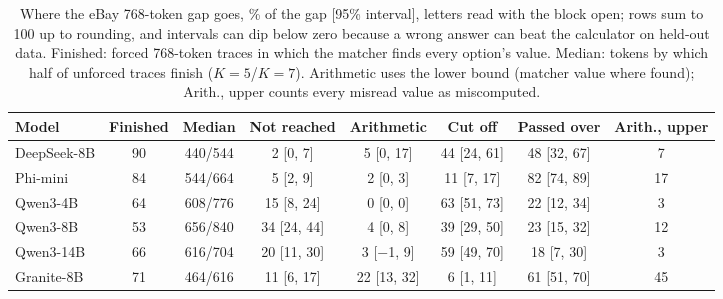 \begin{table}[t]
\caption{Where the eBay 768-token gap goes, \% of the gap [95\% interval], letters read with the block open; rows sum to 100 up to rounding, and intervals can dip below zero because a wrong answer can beat the calculator on held-out data. Finished: forced 768-token traces in which the matcher finds every option's value. Median: tokens by which half of unforced traces finish ($K=5$/$K=7$). Arithmetic uses the lower bound (matcher value where found); Arith., upper counts every misread value as miscomputed.}
\label{tab:splitebay}
\footnotesize
\centering

\begin{tabular}{lcccccc c}
\toprule
Model & Finished & Median & Not reached & Arithmetic & Cut off & Passed over & Arith., upper \\
\midrule
DeepSeek-8B & 90 & 440/544 & 2 [0, 7] & 5 [0, 17] & 44 [24, 61] & 48 [32, 67] & 7 \\
Phi-mini & 84 & 544/664 & 5 [2, 9] & 2 [0, 3] & 11 [7, 17] & 82 [74, 89] & 17 \\
Qwen3-4B & 64 & 608/776 & 15 [8, 24] & 0 [0, 0] & 63 [51, 73] & 22 [12, 34] & 3 \\
Qwen3-8B & 53 & 656/840 & 34 [24, 44] & 4 [0, 8] & 39 [29, 50] & 23 [15, 32] & 12 \\
Qwen3-14B & 66 & 616/704 & 20 [11, 30] & 3 [$-$1, 9] & 59 [49, 70] & 18 [7, 30] & 3 \\
Granite-8B & 71 & 464/616 & 11 [6, 17] & 22 [13, 32] & 6 [1, 11] & 61 [51, 70] & 45 \\
\bottomrule
\end{tabular}
\end{table}
